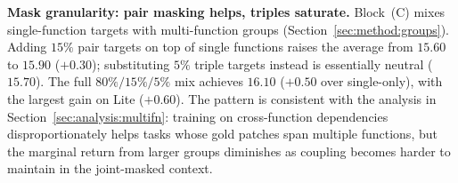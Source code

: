 \textbf{Mask granularity: pair masking helps, triples saturate.}
Block~(C) mixes single-function targets with multi-function groups
(Section~\ref{sec:method:groups}). Adding $15\%$ pair targets on top of
single functions raises the average from $15.60$ to $15.90$ ($+0.30$);
substituting $5\%$ triple targets instead is essentially neutral
($15.70$). The full $80\%/15\%/5\%$ mix achieves $16.10$ ($+0.50$ over
single-only), with the largest gain on Lite ($+0.60$). The pattern is
consistent with the analysis in Section~\ref{sec:analysis:multifn}:
training on cross-function dependencies disproportionately helps tasks
whose gold patches span multiple functions, but the marginal return
from larger groups diminishes as coupling becomes harder to maintain in
the joint-masked context.
